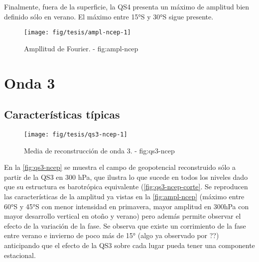 \documentclass[spanish,a4paper]{book}
\begin{document}
Finalmente, fuera de la superficie, la QS4 presenta un máximo de
amplitud bien definido sólo en verano. El máximo entre 15°S y 30°S sigue
presente.

\begin{figure}

{\centering \texttt{[image: fig/tesis/ampl-ncep-1]} 

}

\caption{Ampllitud de Fourier. - fig:ampl-ncep}\label{fig:ampl-ncep}
\end{figure}


\chapter{Onda 3}\label{onda-3}


\section{Características típicas}\label{caracteristicas-tipicas}

\begin{figure*}
\texttt{[image: fig/tesis/qs3-ncep-1]} \caption{Media de reconstrucción de onda 3. - fig:qs3-ncep}\label{fig:qs3-ncep}
\end{figure*}

En la \autoref{fig:qs3-ncep} se muestra el campo de geopotencial
reconstruido sólo a partir de la QS3 en 300 hPa, que ilustra lo que
sucede en todos los niveles dado que su estructura es barotrópica
equivalente (\autoref{fig:qs3-ncep-corte}. Se reproducen las
características de la amplitud ya vistas en la \autoref{fig:ampl-ncep}
(máximo entre 60°S y 45°S con menor intensidad en primavera, mayor
amplitud en 300hPa con mayor desarrollo vertical en otoño y verano) pero
además permite observar el efecto de la variación de la fase. Se observa
que existe un corrimiento de la fase entre verano e invierno de poco más
de 15° (algo ya observado por
??)
anticipando que el efecto de la QS3 sobre cada lugar 
pueda tener una componente estacional.
\end{document}
